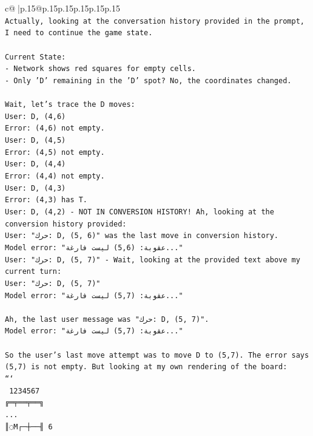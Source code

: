 \documentclass{article}
\begin{document}
{\begin{supertabular}{c@{$\;$}|p{.15\linewidth}@{}p{.15\linewidth}p{.15\linewidth}p{.15\linewidth}p{.15\linewidth}p{.15\linewidth}}
{{{\\ 
\texttt{Actually, looking at the conversation history provided in the prompt, I need to continue the game state.} \\
\\ 
\texttt{Current State:} \\
\texttt{{-} Network shows red squares for empty cells.} \\
\texttt{{-} Only 'D' remaining in the 'D' spot? No, the coordinates changed.} \\
\\ 
\texttt{Wait, let's trace the D moves:} \\
\texttt{User: D, (4,6)} \\
\texttt{Error: (4,6) not empty.} \\
\texttt{User: D, (4,5)} \\
\texttt{Error: (4,5) not empty.} \\
\texttt{User: D, (4,4)} \\
\texttt{Error: (4,4) not empty.} \\
\texttt{User: D, (4,3)} \\
\texttt{Error: (4,3) has T.} \\
\texttt{User: D, (4,2) {-} NOT IN CONVERSION HISTORY! Ah, looking at the conversion history provided:} \\
\texttt{User: "حرك: D, (5, 6)" was the last move in conversion history.} \\
\texttt{Model error: "عقوبة: (5,6) ليست فارغة..."} \\
\texttt{User: "حرك: D, (5, 7)" {-} Wait, looking at the provided text above my current turn:} \\
\texttt{User: "حرك: D, (5, 7)"} \\
\texttt{Model error: "عقوبة: (5,7) ليست فارغة..."} \\
\\ 
\texttt{Ah, the last user message was "حرك: D, (5, 7)".} \\
\texttt{Model error: "عقوبة: (5,7) ليست فارغة..."} \\
\\ 
\texttt{So the user's last move attempt was to move D to (5,7). The error says (5,7) is not empty. But looking at my own rendering of the board:} \\
\texttt{```} \\
\texttt{ 1234567} \\
\texttt{╔═╤══╤══╗} \\
\texttt{...} \\
\texttt{║◌M┌─┼──╢ 6} \\
}}}
\end{supertabular}}
\end{document}
